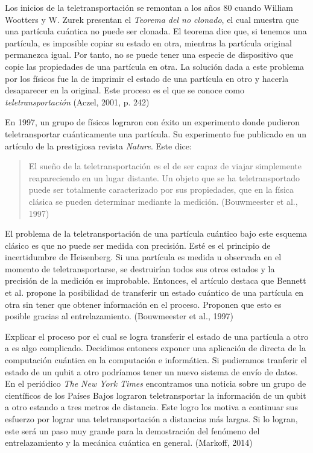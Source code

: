 \documentclass[11pt,a4paper]{article}
\begin{document}
Los inicios de la teletransportación se remontan a los años 80 cuando William Wootters y W. Zurek presentan el \textit{Teorema del no clonado}, el cual muestra que una partícula cuántica no puede ser clonada. El teorema dice que, si tenemos una partícula, es imposible copiar su estado en otra, mientras la partícula original permanezca igual.  Por tanto, no se puede tener una especie de dispositivo que copie las propiedades de una partícula en otra. La solución dada a este problema por los físicos fue la de imprimir el estado de una partícula en otro y hacerla desaparecer en la original. Este proceso es el que se conoce como \textit{teletransportación}  (Aczel, 2001, p. 242)

En 1997, un grupo de físicos lograron con éxito un experimento donde pudieron teletransportar cuánticamente una partícula. Su experimento fue publicado en un artículo de la prestigiosa revista \textit{Nature}. Este dice:
\begin{quote}
El sueño de la teletransportación es el de ser capaz de viajar simplemente reapareciendo en un lugar distante. Un objeto que se ha teletransportado puede ser totalmente caracterizado por sus propiedades, que en la física clásica se pueden determinar mediante la medición. (Bouwmeester et al., 1997)
\end{quote}

El problema de la teletransportación de una partícula cuántico bajo este esquema clásico es que no puede ser medida con precisión. Esté es el principio de incertidumbre de Heisenberg. Si una partícula es medida u observada en el momento de teletransportarse, se destruirían todos sus otros estados y la precisión de la medición es improbable. Entonces, el artículo destaca que Bennett et al. propone la posibilidad de transferir un estado cuántico de una partícula en otra sin tener que obtener información en el proceso. Proponen que esto es posible gracias al entrelazamiento. (Bouwmeester et al., 1997)

Explicar el proceso por el cual se logra transferir el estado de una partícula a otro a es algo complicado. Decidimos entonces exponer una aplicación de directa de la computación cuántica en la computación e informática. Si pudieramos tranferir el estado de un qubit a otro podríamos tener un nuevo sistema de envío de datos. En el periódico \textit{The New York Times} encontramos una noticia sobre un grupo de científicos de los Países Bajos lograron teletransportar la información de un qubit a otro estando a tres metros de distancia. Este logro los motiva a continuar sus esfuerzo por lograr una teletransportación a distancias más largas. Si lo logran, este será un paso muy grande para la demostración del fenómeno del entrelazamiento y la mecánica cuántica en general. (Markoff, 2014)
\clearpage
\end{document}
